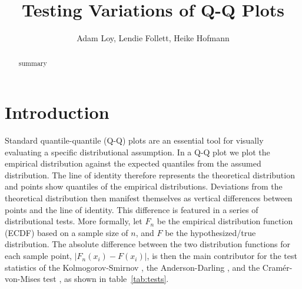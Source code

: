 \documentclass{article}\usepackage[]{graphicx}\usepackage[]{color}
\title{Testing Variations of Q-Q Plots}
\author{Adam Loy, Lendie Follett, Heike Hofmann}
\begin{document}
\maketitle
\begin{abstract}
summary
\end{abstract}








\section{Introduction}

Standard quantile-quantile (Q-Q) plots \citep{Wilk:1968} are an essential tool for  visually evaluating a specific distributional assumption. In a Q-Q plot we plot the empirical distribution against the expected quantiles from the assumed distribution. The line of identity therefore represents the theoretical distribution and points show quantiles of the empirical distributions. Deviations from the theoretical distribution then manifest themselves as vertical differences between points and the line of identity. This difference is featured in a series of distributional tests. More formally, let $F_n$ be the empirical distribution function (ECDF) based on a sample size of $n$, and $F$ be the hypothesized/true distribution. The absolute difference between the two distribution functions for each sample point, $\left| F_n(x_i) - F(x_i) \right|$, is then the main contributor for the test statistics of the Kolmogorov-Smirnov \cite[KS-test,][]{kolmogorov:1933, smirnov:1948}, the Anderson-Darling \citep[AD-test,][]{adtest:1954}, and the Cram\'{e}r-von-Mises test \citep[CVM-test,][]{cramer:1928, mises:1928}, as shown in table~\ref{tab:tests}.
\end{document}

